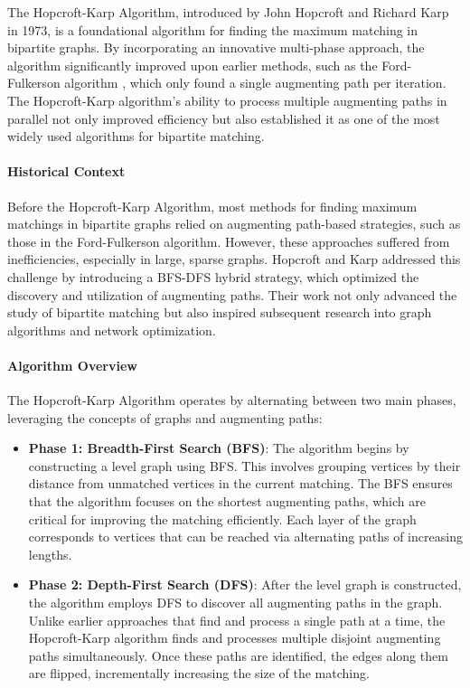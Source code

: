 
The Hopcroft-Karp Algorithm, introduced by John Hopcroft and Richard Karp in 1973, is a foundational algorithm for finding the maximum matching in bipartite graphs. By incorporating an innovative multi-phase approach, the algorithm significantly improved upon earlier methods, such as the Ford-Fulkerson algorithm \cite{ford1956flows}, which only found a single augmenting path per iteration. The Hopcroft-Karp algorithm’s ability to process multiple augmenting paths in parallel not only improved efficiency but also established it as one of the most widely used algorithms for bipartite matching. 

\paragraph{Historical Context}
Before the Hopcroft-Karp Algorithm, most methods for finding maximum matchings in bipartite graphs relied on augmenting path-based strategies, such as those in the Ford-Fulkerson algorithm. However, these approaches suffered from inefficiencies, especially in large, sparse graphs. Hopcroft and Karp addressed this challenge by introducing a BFS-DFS hybrid strategy, which optimized the discovery and utilization of augmenting paths. Their work not only advanced the study of bipartite matching but also inspired subsequent research into graph algorithms and network optimization.

\paragraph{Algorithm Overview}
The Hopcroft-Karp Algorithm operates by alternating between two main phases, leveraging the concepts of graphs and augmenting paths:

\begin{itemize}
    \item \textbf{Phase 1: Breadth-First Search (BFS)}:
    The algorithm begins by constructing a level graph using BFS. This involves grouping vertices by their distance from unmatched vertices in the current matching. The BFS ensures that the algorithm focuses on the shortest augmenting paths, which are critical for improving the matching efficiently. Each layer of the graph corresponds to vertices that can be reached via alternating paths of increasing lengths.

    \item \textbf{Phase 2: Depth-First Search (DFS)}:
    After the level graph is constructed, the algorithm employs DFS to discover all augmenting paths in the graph. Unlike earlier approaches that find and process a single path at a time, the Hopcroft-Karp algorithm finds and processes multiple disjoint augmenting paths simultaneously. Once these paths are identified, the edges along them are flipped, incrementally increasing the size of the matching.
\end{itemize}

